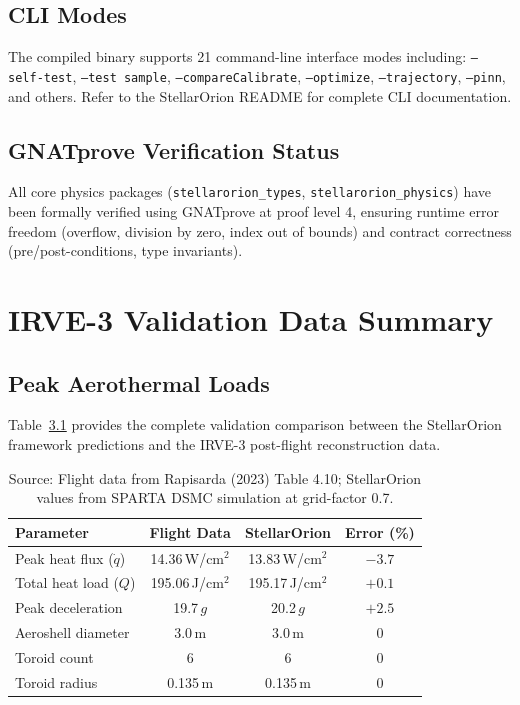 \section{CLI Modes}

The compiled binary supports 21 command-line interface modes including: \texttt{--self-test}, \texttt{--test sample}, \texttt{--compareCalibrate}, \texttt{--optimize}, \texttt{--trajectory}, \texttt{--pinn}, and others. Refer to the StellarOrion README for complete CLI documentation.

\section{GNATprove Verification Status}

All core physics packages (\texttt{stellarorion\_types}, \texttt{stellarorion\_physics}) have been formally verified using GNATprove at proof level 4, ensuring runtime error freedom (overflow, division by zero, index out of bounds) and contract correctness (pre/post-conditions, type invariants).

\chapter{IRVE-3 Validation Data Summary}
\label{app:validation_data}

\section{Peak Aerothermal Loads}

Table~\ref{tab:validation_full} provides the complete validation comparison between the StellarOrion framework predictions and the IRVE-3 post-flight reconstruction data.

\begin{table}[H]
\centering
\caption{Complete IRVE-3 validation comparison (peak values).}
\label{tab:validation_full}
\begin{tabular}{lccc}
\hline
\textbf{Parameter} & \textbf{Flight Data} & \textbf{StellarOrion} & \textbf{Error (\%)} \\
\hline
Peak heat flux ($\dot{q}$) & 14.36\,W/cm$^2$ & 13.83\,W/cm$^2$ & $-3.7$ \\
Total heat load ($Q$) & 195.06\,J/cm$^2$ & 195.17\,J/cm$^2$ & $+0.1$ \\
Peak deceleration & 19.7\,$g$ & 20.2\,$g$ & $+2.5$ \\
Aeroshell diameter & 3.0\,m & 3.0\,m & 0 \\
Toroid count & 6 & 6 & 0 \\
Toroid radius & 0.135\,m & 0.135\,m & 0 \\
\hline
\end{tabular}
\caption*{Source: Flight data from Rapisarda (2023) Table 4.10; StellarOrion values from SPARTA DSMC simulation at grid-factor 0.7.}
\end{table}

